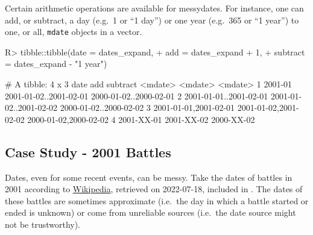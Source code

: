 \documentclass[
]{jss}
\begin{document}
Certain arithmetic operations are available for messydates. For
instance, one can add, or subtract, a day (e.g.~1 or ``1 day'') or one
year (e.g.~365 or ``1 year'') to one, or all, \texttt{mdate} objects in
a vector.

\begin{CodeChunk}
\begin{CodeInput}
R> tibble::tibble(date = dates_expand,
+                add = dates_expand + 1,
+                subtract = dates_expand - "1 year")
\end{CodeInput}
\begin{CodeOutput}
# A tibble: 4 x 3
  date                    add                     subtract               
  <mdate>                 <mdate>                 <mdate>                
1 2001-01                 2001-01-02..2001-02-01  2000-01-02..2000-02-01 
2 2001-01-01..2001-02-01  2001-01-02..2001-02-02  2000-01-02..2000-02-02 
3 {2001-01-01,2001-02-01} {2001-01-02,2001-02-02} {2000-01-02,2000-02-02}
4 2001-XX-01              2001-XX-02              2000-XX-02             
\end{CodeOutput}
\end{CodeChunk}

\hypertarget{case-study---2001-battles}{%
\subsection{Case Study - 2001 Battles}\label{case-study---2001-battles}}

Dates, even for some recent events, can be messy. Take the dates of
battles in 2001 according to
\href{https://en.wikipedia.org/wiki/List_of_battles_in_the_21st_century}{Wikipedia},
retrieved on 2022-07-18, included in . The dates of
these battles are sometimes approximate (i.e.~the day in which a battle
started or ended is unknown) or come from unreliable sources (i.e.~the
date source might not be trustworthy).
\end{document}
